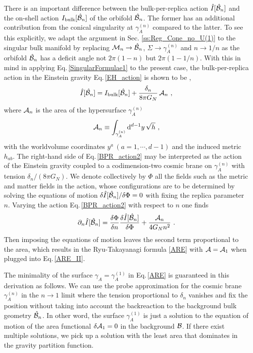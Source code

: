 There is an important difference between the bulk-per-replica action $\hat I [\hat {{\cal B}}_n]$ and the on-shell action $I_\text{bulk}[\hat {{\cal B}}_n]$ of the orbifold $\hat {{\cal B}}_n$.
The former has an additional contribution from the conical singularity at $\gamma_A^{(n)}$ compared to the latter.
To see this explicitly, we adapt the argument in Sec. \ref{ss:Reg_Cone_no_U(1)} to the singular bulk manifold by replacing ${\cal M}_n \to \hat {{\cal B}}_n$, $\Sigma \to \gamma_A^{(n)}$ and $n \to 1/n$ as the orbifold $\hat {{\cal B}}_n$ has a deficit angle not $2\pi (1-n)$ but $2\pi(1-1/n)$.
With this in mind in applying Eq.\,\eqref{SingularFormulae1} to the present case, 
the bulk-per-replica action in the Einstein gravity Eq.\,\eqref{EH_action} is shown to be \cite{Dong:2016fnf,Nakaguchi:2016zqi},
\begin{align}\label{BPR_action2}
	\hat I [\hat {{\cal B}}_n] = I_\text{bulk}[\hat {{\cal B}}_n] + \frac{\delta_n}{8\pi G_N}\, {\cal A}_n \ ,
\end{align}
where ${\cal A}_n$ is the area of the hypersurface $\gamma_A^{(n)}$
\begin{align}
	{\cal A}_n \equiv \int_{\gamma_A^{(n)}} \mathrm{d}^{d-1} y\,\sqrt{h} \ ,
\end{align}
with the worldvolume coordinates $y^a~(a=1,\cdots, d-1)$ and the induced metric $h_{ab}$.
The right-hand side of Eq.\,\eqref{BPR_action2} may be interpreted as the action of the Einstein gravity coupled to a codimension-two cosmic brane on $\gamma_A^{(n)}$ with tension $\delta_n/(8\pi G_N)$.
We denote collectively by $\Phi$ all the fields such as the metric and matter fields in the action, whose configurations are to be determined by solving the equations of motion $\delta \hat I [\hat {{\cal B}}_n]/\delta \Phi = 0$ with fixing the replica parameter $n$.
Varying the action Eq.\,\eqref{BPR_action2} with respect to $n$ one finds
\begin{align}\label{BPR_action_Der}
	\partial_n \hat I [\hat {{\cal B}}_n] = \frac{\delta \Phi}{\delta n} \frac{\delta \hat I [\hat {{\cal B}}_n]}{\delta \Phi} + \frac{{\cal A}_n}{4G_N n^2} \ .
\end{align}
Then imposing the equations of motion leaves the second term proportional to the area, which results in the Ryu-Takayanagi formula \eqref{ARE} with ${\cal A} = {\cal A}_1$ when plugged into Eq.\,\eqref{ARE_II}.

The minimality of the surface $\gamma_A = \gamma_A^{(1)}$ in Eq.\,\eqref{ARE} is guaranteed in this derivation as follows.
We can use the probe approximation for the cosmic brane $\gamma_A^{(n)}$ in the $n \to 1$ limit where the tension proportional to $\delta_n$ vanishes and fix the position without taking into account the backreaction to the background bulk geometry $\hat {{\cal B}}_n$.
In other word, the surface $\gamma_A^{(1)}$ is just a solution to the equation of motion of the area functional $\delta {\cal A}_1 = 0$ in the background ${\cal B}$.
If there exist multiple solutions, we pick up a solution with the least area that dominates in the gravity partition function.


